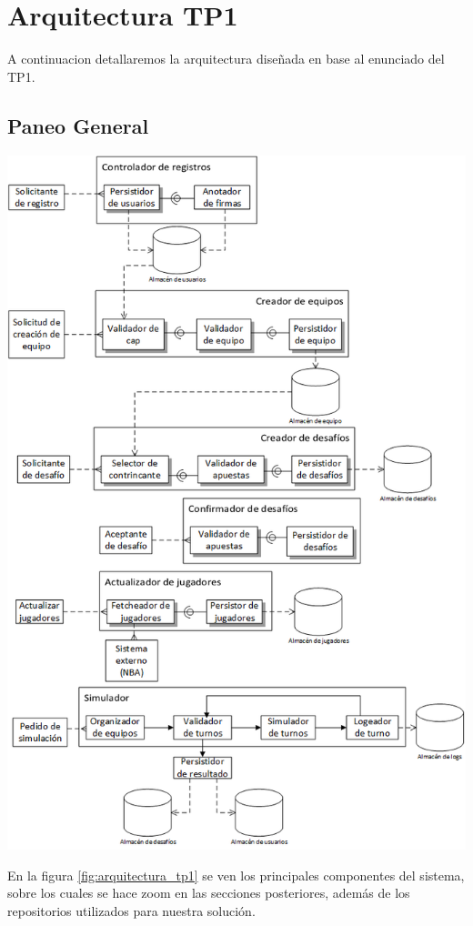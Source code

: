 \section{Arquitectura TP1}
A continuacion detallaremos la arquitectura diseñada en base al enunciado del TP1.

\subsection{Paneo General}
\begin{center}
\includegraphics[scale=0.70]{diagramas/tp1/arquitectura_tp1.png}
\end{center}
\label{fig:arquitectura_tp1}

En la figura \ref{fig:arquitectura_tp1} se ven los principales componentes del sistema, sobre los cuales se hace zoom en las secciones posteriores, además de los repositorios utilizados para nuestra solución.

